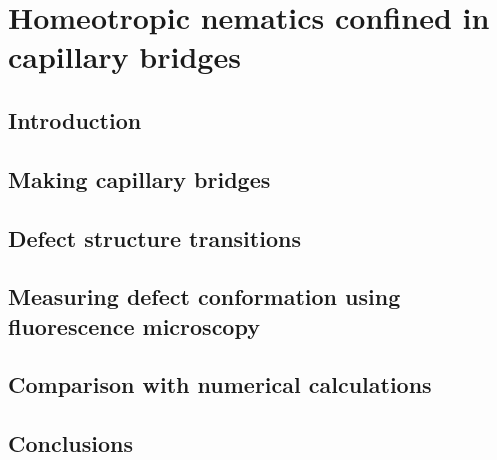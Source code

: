 \chapter{Homeotropic nematics confined in capillary bridges}

\section{Introduction}

\section{Making capillary bridges}

\section{Defect structure transitions}

\section{Measuring defect conformation using fluorescence microscopy}

\section{Comparison with numerical calculations}

\section{Conclusions}